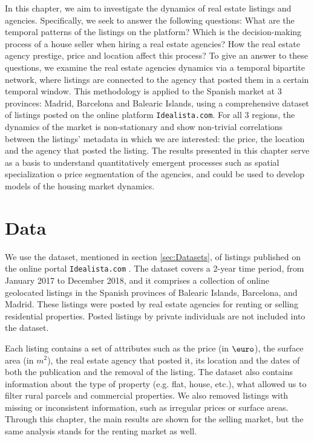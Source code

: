 In this chapter, we aim to investigate the dynamics of real estate listings and agencies. Specifically, we seek to answer the following questions: What are the temporal patterns of the listings on the platform? Which is the decision-making process of a house seller when hiring a real estate agencies? How the real estate agency prestige, price and location affect this process? To give an answer to these questions, we examine the real estate agencies dynamics via a temporal bipartite network, where listings are connected to the agency that posted them in a certain temporal window. This methodology is applied to the Spanish market at 3 provinces: Madrid, Barcelona and Balearic Islands, using a comprehensive dataset of listings posted on the online platform \texttt{Idealista.com}. For all 3 regions, the dynamics of the market is non-stationary and show non-trivial correlations between the listings' metadata in which we are interested: the price, the location and the agency that posted the listing. The results presented in this chapter serve as a basis to understand quantitatively emergent processes such as spatial specialization o price segmentation of the agencies, and could be used to develop models of the housing market dynamics.

\section{Data \label{sec:Data}}

We use the dataset, mentioned in section \ref{sec:Datasets}, of listings published on the online portal \texttt{Idealista.com} \cite{idealista}. The dataset covers a 2-year time period, from January 2017 to December 2018, and it comprises a collection of online geolocated listings in the Spanish provinces of Balearic Islands, Barcelona, and Madrid. These listings were posted by real estate agencies for renting or selling residential properties. Posted listings by private individuals are not included into the dataset.

Each listing contains a set of attributes such as the price (in $\textup{\euro}$), the surface area (in $m^2$), the real estate agency that posted it, its location and the dates of both the publication and the removal of the listing. The dataset also contains information about the type of property (e.g. flat, house, etc.), what allowed us to filter rural parcels and commercial properties. We also removed listings with missing or inconsistent information, such as irregular prices or surface areas. Through this chapter, the main results are shown for the selling market, but the same analysis stands for the renting market as well.

